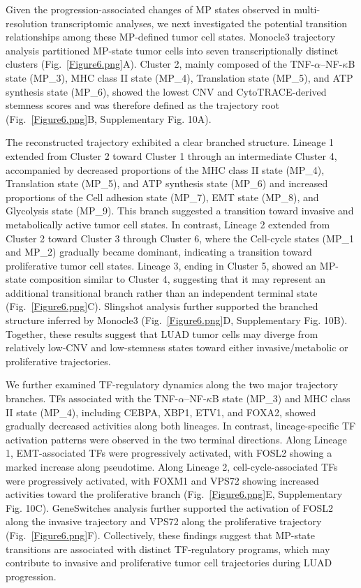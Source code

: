 \documentclass[pdflatex,sn-mathphys-num]{sn-jnl}%
\theoremstyle{thmstyleone}%
\theoremstyle{thmstyletwo}%
\theoremstyle{thmstylethree}%
\begin{document}
Given the progression-associated changes of MP states observed in multi-resolution transcriptomic analyses, we next investigated the potential transition relationships among these MP-defined tumor cell states. Monocle3 trajectory analysis partitioned MP-state tumor cells into seven transcriptionally distinct clusters (Fig.~\ref{Figure6.png}A). Cluster 2, mainly composed of the TNF-$\alpha$--NF-$\kappa$B state (MP\_3), MHC class II state (MP\_4), Translation state (MP\_5), and ATP synthesis state (MP\_6), showed the lowest CNV and CytoTRACE-derived stemness scores and was therefore defined as the trajectory root (Fig.~\ref{Figure6.png}B, Supplementary Fig. 10A).

The reconstructed trajectory exhibited a clear branched structure. Lineage 1 extended from Cluster 2 toward Cluster 1 through an intermediate Cluster 4, accompanied by decreased proportions of the MHC class II state (MP\_4), Translation state (MP\_5), and ATP synthesis state (MP\_6) and increased proportions of the Cell adhesion state (MP\_7), EMT state (MP\_8), and Glycolysis state (MP\_9). This branch suggested a transition toward invasive and metabolically active tumor cell states. In contrast, Lineage 2 extended from Cluster 2 toward Cluster 3 through Cluster 6, where the Cell-cycle states (MP\_1 and MP\_2) gradually became dominant, indicating a transition toward proliferative tumor cell states. Lineage 3, ending in Cluster 5, showed an MP-state composition similar to Cluster 4, suggesting that it may represent an additional transitional branch rather than an independent terminal state (Fig.~\ref{Figure6.png}C). Slingshot analysis further supported the branched structure inferred by Monocle3 (Fig.~\ref{Figure6.png}D, Supplementary Fig. 10B). Together, these results suggest that LUAD tumor cells may diverge from relatively low-CNV and low-stemness states toward either invasive/metabolic or proliferative trajectories.

We further examined TF-regulatory dynamics along the two major trajectory branches. TFs associated with the TNF-$\alpha$--NF-$\kappa$B state (MP\_3) and MHC class II state (MP\_4), including CEBPA, XBP1, ETV1, and FOXA2, showed gradually decreased activities along both lineages. In contrast, lineage-specific TF activation patterns were observed in the two terminal directions. Along Lineage 1, EMT-associated TFs were progressively activated, with FOSL2 showing a marked increase along pseudotime. Along Lineage 2, cell-cycle-associated TFs were progressively activated, with FOXM1 and VPS72 showing increased activities toward the proliferative branch (Fig.~\ref{Figure6.png}E, Supplementary Fig. 10C). GeneSwitches analysis further supported the activation of FOSL2 along the invasive trajectory and VPS72 along the proliferative trajectory (Fig.~\ref{Figure6.png}F). Collectively, these findings suggest that MP-state transitions are associated with distinct TF-regulatory programs, which may contribute to invasive and proliferative tumor cell trajectories during LUAD progression.
\end{document}
